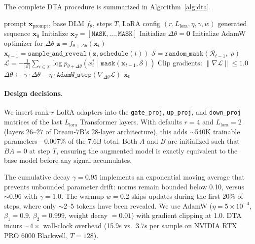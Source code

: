 \documentclass{article}
\begin{document}
The complete DTA procedure is summarized in Algorithm~\ref{alg:dta}.

\begin{algorithm}[t]
\caption{Denoising-Time Adaptation (DTA)}
\label{alg:dta}
\begin{algorithmic}[1]
\Require prompt $\mathbf{x}_{\text{prompt}}$, base DLM $f_\theta$, steps $T$, LoRA config $(r, L_{\text{lora}}, \eta, \gamma, w)$
\Ensure generated sequence $\mathbf{x}_0$
\State Initialize $\mathbf{x}_T = [\texttt{MASK}, \ldots, \texttt{MASK}]$ 
\State Initialize $\Delta\theta = \mathbf{0}$ 
\State Initialize AdamW optimizer for $\Delta\theta$
  \State $\mathbf{z} = f_{\theta + \Delta\theta}(\mathbf{x}_t)$ 
  \State $\mathbf{x}_{t-1} = \texttt{sample\_and\_reveal}(\mathbf{z}, \texttt{schedule}(t))$
   
    \State $\mathcal{S} = \texttt{random\_mask}(\mathcal{R}_{t-1},\; \rho)$ 
    \State $\mathcal{L} = -\frac{1}{|\mathcal{S}|}\sum_{i \in \mathcal{S}} \log p_{\theta+\Delta\theta}(x_i^* \mid \texttt{mask}(\mathbf{x}_{t-1}, \mathcal{S}))$
    \State Clip gradients: $\|\nabla \mathcal{L}\| \leq 1.0$
    \State $\Delta\theta \leftarrow \gamma \cdot \Delta\theta - \eta \cdot \texttt{AdamW\_step}(\nabla_{\Delta\theta}\mathcal{L})$
  \EndIf
\EndFor
\State \Return $\mathbf{x}_0$
\end{algorithmic}
\end{algorithm}

\paragraph{Design decisions.}
We insert rank-$r$ LoRA adapters into the \texttt{gate\_proj}, \texttt{up\_proj}, and \texttt{down\_proj} matrices of the last $L_{\text{lora}}$ Transformer layers. With defaults $r = 4$ and $L_{\text{lora}} = 2$ (layers 26--27 of Dream-7B's 28-layer architecture), this adds ${\sim}$540K trainable parameters---0.007\% of the 7.6B total. Both $A$ and $B$ are initialized such that $BA = 0$ at step $T$, ensuring the augmented model is exactly equivalent to the base model before any signal accumulates.

The cumulative decay $\gamma = 0.95$ implements an exponential moving average that prevents unbounded parameter drift: norms remain bounded below 0.10, versus ${\sim}0.96$ with $\gamma = 1.0$.
The warmup $w = 0.2$ skips updates during the first 20\% of steps, where only ${\sim}2$--5 tokens have been revealed.
We use AdamW ($\eta = 5 \times 10^{-4}$, $\beta_1 = 0.9$, $\beta_2 = 0.999$, weight decay $= 0.01$) with gradient clipping at 1.0. DTA incurs ${\sim}4{\times}$ wall-clock overhead (15.9s vs.\ 3.7s per sample on NVIDIA RTX PRO 6000 Blackwell, $T = 128$).
\end{document}
